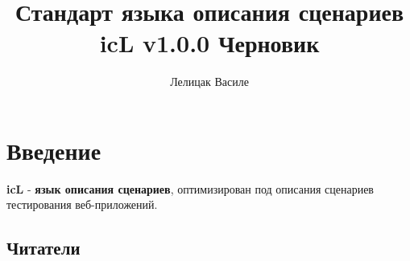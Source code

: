 \documentclass[a4paper, 14pt]{extarticle}
\begin{document}
\newcommand{\tableuni}[6]{
	\begin{longtable}[h]{#1}
	\caption*{Таблица \thetable{}: #5} \label{#4} \\

	\hline
	#2
	#3
	\endfirsthead

	\multicolumn{3}{l}%
	{{Продолжение таблицы \thetable{}: #5}} \\
	#3
	\endhead

	\hline
	\endfoot

	\hline
	\endlastfoot
#6
	\end{longtable}
}

\newcommand{\stableuni}[6]{
	\begin{longtable}[h]{#1}
	\caption*{Таблица \thetable{}: #4} \label{#3} \\

	\hline
	#2
	\hline
	\endfirsthead

	\multicolumn{3}{l}%
	{{Продолжение таблицы \thetable{}: #4}} \\
	\hline
	#2
	\hline
	\endhead

	\hline
	\endfoot

	\hline
	\endlastfoot
#5
	\end{longtable}
}


\title{Стандарт языка описания сценариев icL v1.0.0 Черновик}
\author{Лелицак Василе}

\maketitle

\newpage
\renewcommand{\contentsname}{\textsf{Оглавление}}
\tableofcontents

\newpage

\section{Введение}

\indent \textbf{icL} - \textbf{язык описания сценариев}, оптимизирован под описания сценариев тестирования веб-приложений.

\subsection{Читатели}
\end{document}
